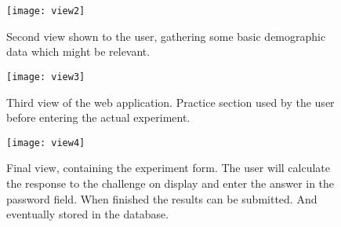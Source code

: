 \begin{figure}
    \texttt{[image: view2]}
    \caption{Second view shown to the user, gathering some basic demographic data which might be relevant. }
    \label{view2}
\end{figure}

\begin{figure}
    \texttt{[image: view3]}
    \caption{Third view of the web application. Practice section used by the user before entering the actual experiment.}
    \label{view3}
\end{figure}

\begin{figure}
    \texttt{[image: view4]}
    \caption{Final view, containing the experiment form. The user will calculate the response to the challenge on display and enter the answer in the password field. When finished the results can be submitted. And eventually stored in the database.}
    \label{view4}
\end{figure}
